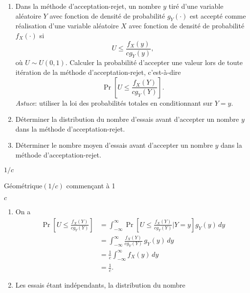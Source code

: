 \begin{exercice}
  \begin{enumerate}
  \item Dans la méthode d'acceptation-rejet, un nombre $y$ tiré d'une
    variable aléatoire $Y$ avec fonction de densité de probabilité
    $g_Y(\cdot)$ est accepté comme réalisation d'une variable
    aléatoire $X$ avec fonction de densité de probabilité $f_X(\cdot)$ si
    \begin{displaymath}
      U \leq \frac{f_X(y)}{c g_Y(y)},
    \end{displaymath}
    où $U \sim U(0, 1)$. Calculer la probabilité d'accepter une valeur
    lors de toute itération de la méthode d'acceptation-rejet,
    c'est-à-dire
    \begin{displaymath}
      \Pr \left[ U \leq \frac{f_X(Y)}{c g_Y(Y)} \right].
    \end{displaymath}
    \emph{Astuce}: utiliser la loi des probabilités totales en
    conditionnant sur $Y = y$.
  \item Déterminer la distribution du nombre d'essais avant d'accepter
    un nombre $y$ dans la méthode d'acceptation-rejet.
  \item Déterminer le nombre moyen d'essais avant d'accepter un nombre
    $y$ dans la méthode d'acceptation-rejet.
  \end{enumerate}
  \begin{rep}
    \begin{inparaenum}
    \item $1/c$
    \item Géométrique$(1/c)$ commençant à 1
    \item $c$
    \end{inparaenum}
  \end{rep}
  \begin{sol}
    \begin{enumerate}
    \item On a
      \begin{align*}
        \Pr \left[ U \leq \frac{f_X(Y)}{c g_Y(Y)} \right]
        &= \int_{-\infty}^\infty
        \Pr \left[ U \leq \frac{f_X(Y)}{c g_Y(Y)}|Y = y \right]
        g_Y(y)\, dy \\
        &= \int_{-\infty}^\infty
        \frac{f_X(Y)}{c g_Y(Y)}\, g_Y(y)\, dy \\
        &= \frac{1}{c} \int_{-\infty}^\infty f_X(y)\, dy \\
        &= \frac{1}{c}.
      \end{align*}
    \item Les essais étant indépendants, la distribution du nombre

\end{enumerate}
\end{sol}
\end{exercice}
